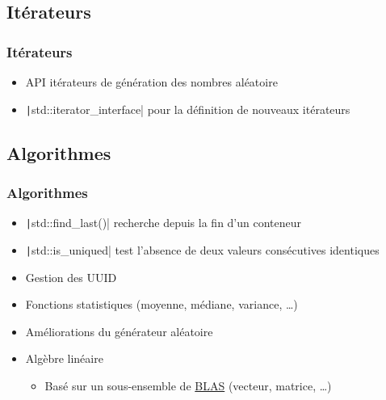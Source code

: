 \documentclass[C++.tex]{subfiles}
\begin{document}
\subsection*{Itérateurs}
\begin{frame}[fragile]
	\frametitle{Itérateurs}
	\begin{itemize}
		\item API \og itérateurs\fg{} de génération des nombres aléatoire
		\item \texttt|std::iterator_interface| pour la définition de nouveaux itérateurs
	\end{itemize}
\end{frame}

\subsection*{Algorithmes}
\begin{frame}[fragile]
	\frametitle{Algorithmes}
	\begin{itemize}
		\item \texttt|std::find_last()| recherche depuis la fin d'un conteneur
		\item \texttt|std::is_uniqued| test l'absence de deux valeurs consécutives identiques
		\item Gestion des UUID
		\item Fonctions statistiques (moyenne, médiane, variance, \ldots{})
		\item Améliorations du générateur aléatoire
		\item Algèbre linéaire
		\begin{itemize}
			\item Basé sur un sous-ensemble de \href{https://www.netlib.org/blas/}{BLAS} (vecteur, matrice, \ldots{})
		\end{itemize}
	\end{itemize}
\end{frame}
\end{document}
